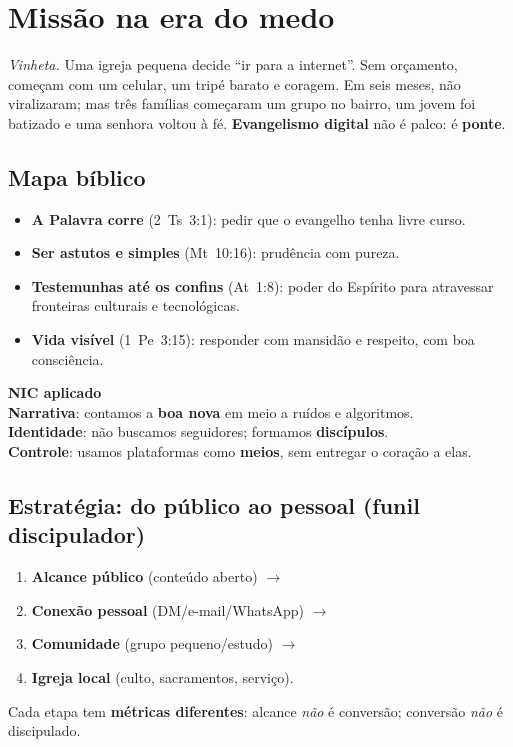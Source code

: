 \chapter{Missão na era do medo}
\noindent\textit{Vinheta.} Uma igreja pequena decide ``ir para a internet''. Sem orçamento, começam com um celular, um tripé barato e coragem. Em seis meses, não viralizaram; mas três famílias começaram um grupo no bairro, um jovem foi batizado e uma senhora voltou à fé. \textbf{Evangelismo digital} não é palco: é \textbf{ponte}.

\section{Mapa bíblico}
\begin{itemize}[leftmargin=*,noitemsep]
  \item \textbf{A Palavra corre} (2~Ts~3:1): pedir que o evangelho tenha livre curso.
  \item \textbf{Ser astutos e simples} (Mt~10:16): prudência com pureza.
  \item \textbf{Testemunhas até os confins} (At~1:8): poder do Espírito para atravessar fronteiras culturais e tecnológicas.
  \item \textbf{Vida visível} (1~Pe~3:15): responder com mansidão e respeito, com boa consciência.
\end{itemize}

\begin{nicbox}
\textbf{NIC aplicado}\\
\textbf{Narrativa}: contamos a \textbf{boa nova} em meio a ruídos e algoritmos.\\
\textbf{Identidade}: não buscamos seguidores; formamos \textbf{discípulos}.\\
\textbf{Controle}: usamos plataformas como \textbf{meios}, sem entregar o coração a elas.
\end{nicbox}

\section{Estratégia: do público ao pessoal (funil discipulador)}
\begin{enumerate}[leftmargin=*,nosep]
  \item \textbf{Alcance público} (conteúdo aberto) $\rightarrow$ 
  \item \textbf{Conexão pessoal} (DM/e-mail/WhatsApp) $\rightarrow$ 
  \item \textbf{Comunidade} (grupo pequeno/estudo) $\rightarrow$ 
  \item \textbf{Igreja local} (culto, sacramentos, serviço).
\end{enumerate}
Cada etapa tem \textbf{métricas diferentes}: alcance \emph{não} é conversão; conversão \emph{não} é discipulado.

